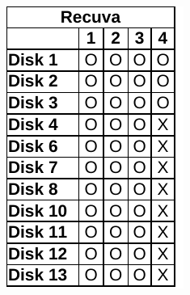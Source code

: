\begin{paraphrase}
\begin{figure}
\begin{subfigure}[t]{0.17\linewidth}
        \includegraphics[width=\linewidth]{fig/recuva_results_ntfs.pdf}
    \end{subfigure}~~
    \begin{subfigure}[t]{0.17\linewidth}

\end{subfigure}
\end{figure}
\end{paraphrase}
